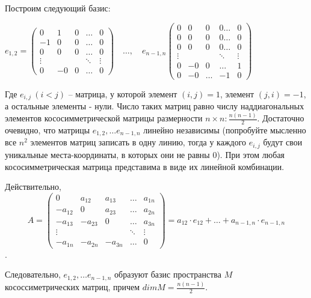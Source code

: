 \documentclass[]{book}
\theoremstyle{definition}
\begin{document}
\begin{enumerate}[resume]
Построим следующий базис:

$e_{1,2} = 
\left(
\begin{smallmatrix}
0       & 1  & 0  & \dots  & 0 \\
-1 & 0       & 0  & \dots  & 0 \\
0 & 0  & 0  & \dots  & 0 \\
\vdots  &         &  & \ddots & \vdots \\
0 & -0 & 0 & \dots  & 0
\end{smallmatrix}
\right)
\quad 
\ldots,\quad  
e_{n-1, n}
\left(
\begin{smallmatrix}
0       & 0    & 0      & 0     \dots  & 0  \\
0       & 0    & 0      & 0     \dots  & 0 \\
0       & 0    & 0      & 0     \dots  & 0 \\
\vdots  &      &        &       \ddots & \vdots \\
0       & -0   & 0      &       \dots  & 1 \\
0       & -0   & \dots  & -1           & 0
\end{smallmatrix}
\right)
$

Где $e_{i,j} \:(i < j)$ -- матрица, у которой элемент $(i,j) = 1$, элемент $(j,i) = -1$, а остальные элементы - нули. Число таких матриц равно числу наддиагональных элементов кососимметрической матрицы размерности $n\times n \colon \frac{n(n-1)}{2}$. Достаточно очевидно, что матрицы $e_{1,2},\ldots e_{n-1, n}$ линейно независимы (попробуйте мысленно все $n^2$ элементов матриц записать в одну линию, тогда у каждого $e_{i,j}$ будут свои уникальные места-координаты, в которых они не равны 0). При этом любая кососимметрическая матрица представима в виде их линейной комбинации.

Действительно, 
$$A = 
\begin{pmatrix}
0       & a_{12}  & a_{13}  & \dots  & a_{1n} \\
-a_{12} & 0       & a_{23}  & \dots  & a_{2n} \\
-a_{13} & -a_{23} & 0       & \dots  & a_{3n} \\
\vdots  &         &         & \ddots & \vdots \\
-a_{1n} & -a_{2n} & -a_{3n} & \dots  & 0
\end{pmatrix} = 
a_{12}\cdot e_{12} + \ldots + a_{n-1, n}\cdot e_{n-1, n}$$.

Следовательно, $e_{1,2},\ldots e_{n-1, n}$ образуют базис пространства $M$ кососсиметрических матриц, причем $dim M = \frac{n(n-1)}{2}$.



\end{enumerate}
\end{document}
